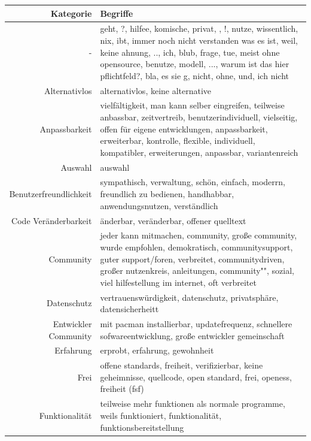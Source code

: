 \documentclass[a4paper]{article}
\begin{document}
            \begin{table}[h]
                \begin{tabularx}{\textwidth}{rX}
                    Kategorie & Begriffe \\
                    \hline
                    - & \tiny geht, ?, hilfee, komische, privat, , !, nutze, wissentlich, nix, ibt, immer noch nicht verstanden was es ist, weil, keine ahnung, .., ich, blub, frage, tue, meist ohne opensource, benutze, modell, ..., warum ist das hier pflichtfeld?, bla, es sie g, nicht, ohne, und, ich nicht\\
                    Alternativlos & \tiny alternativlos, keine alternative\\
                    Anpassbarkeit & \tiny vielfältigkeit, man kann selber eingreifen, teilweise anbassbar, zeitvertreib, benutzerindividuell, vielseitig, offen für eigene entwicklungen, anpassbarkeit, erweiterbar, kontrolle, flexible, individuell, kompatibler, erweiterungen, anpassbar, variantenreich\\
                    Auswahl & \tiny auswahl\\
                    Benutzerfreundlichkeit & \tiny sympathisch, verwaltung, schön, einfach, moderrn, freundlich zu bedienen, handhabbar, anwendungsnutzen, verständlich\\
                    Code Veränderbarkeit & \tiny änderbar, veränderbar, offener quelltext\\
                    Community & \tiny jeder kann mitmachen, community, große community, wurde empfohlen, demokratisch, communitysupport, guter support/foren, verbreitet, communitydriven, großer nutzenkreis, anleitungen, community"", sozial, viel hilfestellung im internet, oft verbreitet\\
                    Datenschutz & \tiny vertrauenswürdigkeit, datenschutz, privatsphäre, datensicherheitt\\
                    Entwickler Community & \tiny mit pacman installierbar, updatefrequenz, schnellere sofwareentwicklung, große entwickler gemeinschaft\\
                    Erfahrung & \tiny erprobt, erfahrung, gewohnheit\\
                    Frei & \tiny offene standards, freiheit, verifizierbar, keine geheimnisse, quellcode, open standard, frei, openess, freiheit (fsf)\\
                    Funktionalität & \tiny teilweise mehr funktionen als normale programme, weils funktioniert, funktionalität, funktionsbereitstellung\\

\end{tabularx}
\end{table}
\end{document}
